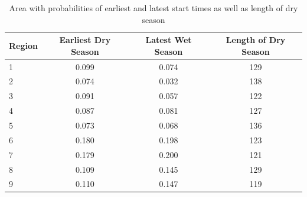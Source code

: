 \documentclass{article}
\begin{document}
\begin{table}[h!]
\begin{tabular}{|l|c|c|c|}
\hline
Region & Earliest Dry Season & Latest Wet Season & Length of Dry Season\\
\hline
\hline
1&0.099&0.074&129 \\
2&0.074&0.032&138 \\
3&0.091&0.057&122 \\
4&0.087&0.081&127\\
5&0.073&0.068&136 \\
6&0.180&0.198&123\\
7&0.179&0.200&121\\
8&0.109&0.145&129\\
9&0.110&0.147&119\\
\hline
\end{tabular}
\caption{Area with probabilities of earliest and latest start times as well as length of dry season }
\label{lengthProb}
\end{table}

\end{document}

